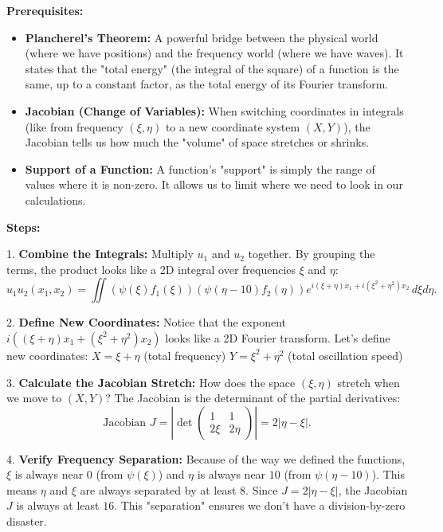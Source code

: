 \begin{solution}
\textbf{Prerequisites:}
\begin{itemize}
    \item \textbf{Plancherel's Theorem:} A powerful bridge between the physical world (where we have positions) and the frequency world (where we have waves). It states that the "total energy" (the integral of the square) of a function is the same, up to a constant factor, as the total energy of its Fourier transform.
    \item \textbf{Jacobian (Change of Variables):} When switching coordinates in integrals (like from frequency $(\xi, \eta)$ to a new coordinate system $(X, Y)$), the Jacobian tells us how much the "volume" of space stretches or shrinks.
    \item \textbf{Support of a Function:} A function's "support" is simply the range of values where it is non-zero. It allows us to limit where we need to look in our calculations.
\end{itemize}

\textbf{Steps:}

\par\vspace{\baselineskip}
1. \textbf{Combine the Integrals:} Multiply $u_1$ and $u_2$ together. By grouping the terms, the product looks like a 2D integral over frequencies $\xi$ and $\eta$:
\[
u_1 u_2(x_1, x_2) = \iint (\psi(\xi)f_1(\xi))(\psi(\eta-10)f_2(\eta)) e^{i(\xi+\eta)x_1 + i(\xi^2+\eta^2)x_2} \, d\xi d\eta.
\]

\par\vspace{\baselineskip}
2. \textbf{Define New Coordinates:} Notice that the exponent $i((\xi+\eta)x_1 + (\xi^2+\eta^2)x_2)$ looks like a 2D Fourier transform. Let's define new coordinates:
$X = \xi + \eta$ (total frequency)
$Y = \xi^2 + \eta^2$ (total oscillation speed)

\par\vspace{\baselineskip}
3. \textbf{Calculate the Jacobian Stretch:} How does the space $(\xi, \eta)$ stretch when we move to $(X, Y)$? The Jacobian is the determinant of the partial derivatives:
\[
\text{Jacobian } J = \left| \det \begin{pmatrix} 1 & 1 \\ 2\xi & 2\eta \end{pmatrix} \right| = 2|\eta - \xi|.
\]

\par\vspace{\baselineskip}
4. \textbf{Verify Frequency Separation:} Because of the way we defined the functions, $\xi$ is always near $0$ (from $\psi(\xi)$) and $\eta$ is always near $10$ (from $\psi(\eta-10)$). This means $\eta$ and $\xi$ are always separated by at least $8$. Since $J = 2|\eta-\xi|$, the Jacobian $J$ is always at least $16$. This "separation" ensures we don't have a division-by-zero disaster.


\end{solution}
